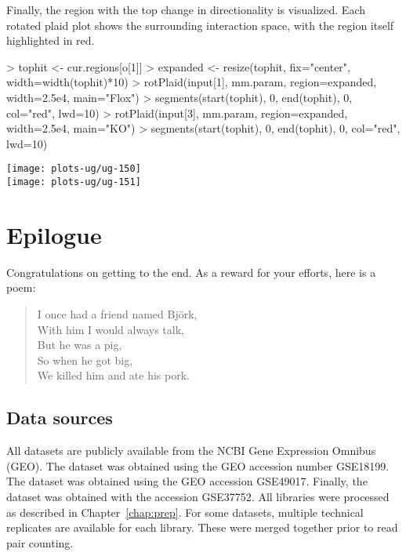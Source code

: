\documentclass[12pt]{report}
\renewenvironment{Schunk}{\vspace{0pt}}{\vspace{0pt}}
\newenvironment{combox}
{ \begin{shaded}\begin{center}\begin{minipage}[t]{0.95\textwidth} }
{ \end{minipage}\end{center}\end{shaded} }
\begin{document}
Finally, the region with the top change in directionality is visualized.
Each rotated plaid plot shows the surrounding interaction space, with the region itself highlighted in red.





\begin{Schunk}
\begin{Sinput}
> tophit <- cur.regions[o[1]]
> expanded <- resize(tophit, fix="center", width=width(tophit)*10)
> rotPlaid(input[1], mm.param, region=expanded, width=2.5e4, main="Flox")
> segments(start(tophit), 0, end(tophit), 0, col="red", lwd=10)
> rotPlaid(input[3], mm.param, region=expanded, width=2.5e4, main="KO")
> segments(start(tophit), 0, end(tophit), 0, col="red", lwd=10)
\end{Sinput}
\end{Schunk}

\begin{center}
\texttt{[image: plots-ug/ug-150]}
\\
\texttt{[image: plots-ug/ug-151]}
\end{center}


\chapter{Epilogue}

\begin{combox}
Congratulations on getting to the end.
As a reward for your efforts, here is a poem:
\begin{quote}
I once had a friend named Bj\"ork, \\
With him I would always talk, \\
But he was a pig, \\
So when he got big, \\
We killed him and ate his pork.
\end{quote}
\end{combox}

\section{Data sources}
All datasets are publicly available from the NCBI Gene Expression Omnibus (GEO).
The \citeauthor{lieberman2009comprehensive} dataset was obtained using the GEO accession number GSE18199.
The \citeauthor{sofueva2013cohesin} dataset was obtained using the GEO accession GSE49017.
Finally, the \citeauthor{rickman2012oncogene} dataset was obtained with the accession GSE37752.
All libraries were processed as described in Chapter~\ref{chap:prep}.
For some datasets, multiple technical replicates are available for each library.
These were merged together prior to read pair counting.
\end{document}
